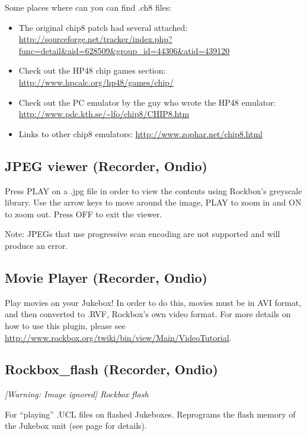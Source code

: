 Some places where can you can find .ch8 files:

\begin{itemize}
\item The original chip8 patch had several attached:
\url{http://sourceforge.net/tracker/index.php?func=detail&aid=628509&group_id=44306&atid=439120}
\item Check out the HP48 chip games section:
\url{http://www.hpcalc.org/hp48/games/chip/}
\item Check out the PC emulator by the guy who wrote the HP48 emulator:
\url{http://www.pdc.kth.se/~lfo/chip8/CHIP8.htm}
\item Links to other chip8 emulators: 
\url{http://www.zophar.net/chip8.html}
\end{itemize}

\subsection{JPEG viewer (Recorder, Ondio)}
Press PLAY on a .jpg file in order to view the contents using Rockbox's greyscale library.  Use the arrow keys to move around the image, PLAY to zoom in
and ON to zoom out.  Press OFF to exit the viewer.

Note: JPEGs that use progressive scan encoding are not supported and will produce an error.

\subsection{Movie Player (Recorder, Ondio)}
Play movies on your Jukebox!  In order to do
this, movies must be in AVI format, and then converted to .RVF,
Rockbox's own video format.  For more details on how to use this plugin, please see \url{http://www.rockbox.org/twiki/bin/view/Main/VideoTutorial}.

\subsection{Rockbox\_flash (Recorder, Ondio)}
{\centering\itshape
  [Warning: Image ignored] %
 \newline
Rockbox flash
\par}

For ``playing'' .UCL files on flashed Jukeboxes. Reprograms the flash memory of
the Jukebox unit (see page \pageref{ref:Rockboxinflash} for details).

